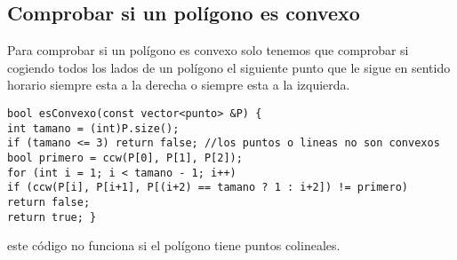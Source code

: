 \subsection{Comprobar si un polígono es convexo}
Para comprobar si un polígono es convexo solo tenemos que comprobar si cogiendo todos los lados de un polígono el siguiente punto
que le sigue en sentido horario siempre esta a la derecha o siempre esta a la izquierda.
\begin{lstlisting}[style=C]
bool esConvexo(const vector<punto> &P) {
int tamano = (int)P.size();
if (tamano <= 3) return false; //los puntos o lineas no son convexos
bool primero = ccw(P[0], P[1], P[2]);
for (int i = 1; i < tamano - 1; i++)
if (ccw(P[i], P[i+1], P[(i+2) == tamano ? 1 : i+2]) != primero)
return false;
return true; }
\end{lstlisting}
este código no funciona si el polígono tiene puntos colineales.
